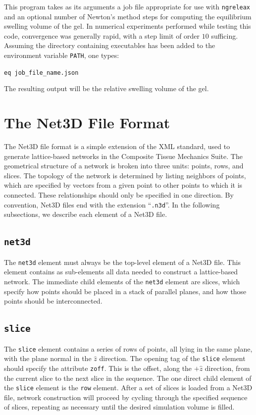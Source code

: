 \documentclass{article}
\begin{document}
This program takes as its arguments a job file appropriate for use with
\texttt{ngreleax} and an optional number of Newton's method steps for
computing the equilibrium swelling volume of the gel. In numerical experiments
performed while testing this code, convergence was generally rapid, with
a step limit of order $10$ sufficing. Assuming the directory containing
executables has been added to the environment variable \texttt{PATH}, one types:

\begin{center}
\texttt{eq job\_file\_name.json}
\end{center}
The resulting output will be the relative swelling volume of the gel.

\nocite{*}

{}

\appendix

\section{The Net3D File Format}

The Net3D file format is a simple extension of the XML standard, used to
generate lattice-based networks in the Composite Tissue Mechanics Suite. The 
geometrical structure of a network is broken into three units: points, rows,
and slices. The topology of the network is determined by listing neighbors
of points, which are specified by vectors from a given point to other points
to which it is connected. These relationships should only be specified in
one direction. By convention, Net3D files end with the extension
``\texttt{.n3d}''. In the following subsections, we describe each element of
a Net3D file.

\subsection{\texttt{net3d}}
The \texttt{net3d} element must always be the top-level element of a Net3D file.
This element contains as sub-elements all data needed to construct a
lattice-based network. The immediate child elements of the \texttt{net3d}
element are slices, which specify how points should be placed in a stack of
parallel planes, and how those points should be interconnected.

\subsection{\texttt{slice}}
The \texttt{slice} element contains a series of rows of points, all lying
in the same plane, with the plane normal in the $\hat{z}$ direction. The opening
tag of the \texttt{slice} element should specify the attribute \texttt{zoff}.
This is the offset, along the $+\hat{z}$ direction, from the current slice to
the next slice in the sequence. The one direct child element of the
\texttt{slice} element is the \texttt{row} element. After a set of slices is
loaded from a Net3D file, network construction will proceed by cycling through 
the specified sequence of slices, repeating as necessary until the desired
simulation volume is filled.
\end{document}
